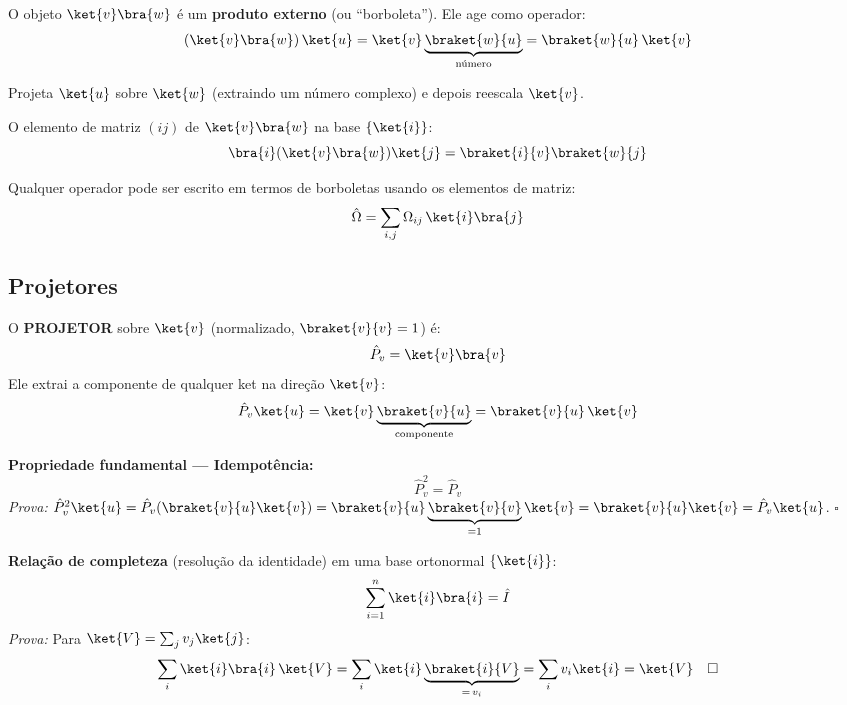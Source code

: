O objeto $\ket{v}\bra{w}$ é um \textbf{produto externo} (ou ``borboleta''). Ele age como operador:
\begin{equation}
    \left(\ket{v}\bra{w}\right)\ket{u} = \ket{v}\underbrace{\braket{w}{u}}_{\text{número}} = \braket{w}{u}\,\ket{v}
\end{equation}

Projeta $\ket{u}$ sobre $\ket{w}$ (extraindo um número complexo) e depois reescala $\ket{v}$.

O elemento de matriz $(ij)$ de $\ket{v}\bra{w}$ na base $\{\ket{i}\}$:
\begin{equation}
    \bra{i}\!\left(\ket{v}\bra{w}\right)\!\ket{j} = \braket{i}{v}\braket{w}{j}
\end{equation}

Qualquer operador pode ser escrito em termos de borboletas usando os elementos de matriz:
\begin{equation}
    \hat{\Omega} = \sum_{i,j} \Omega_{ij}\,\ket{i}\bra{j}
\end{equation}

\subsection*{Projetores}

\begin{shadequote}
    O \textbf{PROJETOR} sobre $\ket{v}$ (normalizado, $\braket{v}{v}=1$) é:
    \begin{equation}
        \hat{P}_v = \ket{v}\bra{v}
    \end{equation}
    Ele extrai a componente de qualquer ket na direção $\ket{v}$:
    \[
        \hat{P}_v\ket{u} = \ket{v}\underbrace{\braket{v}{u}}_{\text{componente}} = \braket{v}{u}\,\ket{v}
    \]
\end{shadequote}

\textbf{Propriedade fundamental --- Idempotência:}
\begin{equation}
    \hat{P}_v^2 = \hat{P}_v
\end{equation}
\textit{Prova:} $\hat{P}_v^2\ket{u} = \hat{P}_v\!\left(\braket{v}{u}\ket{v}\right) = \braket{v}{u}\underbrace{\braket{v}{v}}_{=1}\ket{v} = \braket{v}{u}\ket{v} = \hat{P}_v\ket{u}$. $\square$

\textbf{Relação de completeza} (resolução da identidade) em uma base ortonormal $\{\ket{i}\}$:
\begin{equation}
    \sum_{i=1}^n \ket{i}\bra{i} = \hat{I}
    \label{eq:completeza}
\end{equation}
\textit{Prova:} Para $\ket{V} = \sum_j v_j\ket{j}$:
\[
    \sum_i \ket{i}\bra{i}\,\ket{V} = \sum_i \ket{i}\underbrace{\braket{i}{V}}_{=\,v_i} = \sum_i v_i\ket{i} = \ket{V} \quad \square
\]

